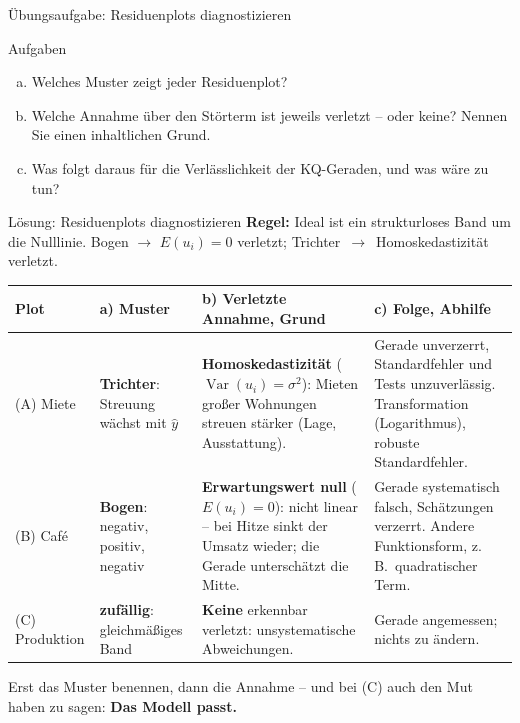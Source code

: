 \documentclass[aspectratio=169,11pt]{beamer}
\begin{document}
\begin{frame}{Übungsaufgabe: Residuenplots diagnostizieren}
\begin{center}
\begin{tikzpicture}
    \end{tikzpicture}
  \end{center}
  \vspace{-8.5pt}
  \begin{exampleblock}{Aufgaben}
    \begin{enumerate}[a)]
      \setlength{\itemsep}{0pt}
      \item Welches Muster zeigt jeder Residuenplot?
      \item Welche Annahme über den Störterm ist jeweils verletzt -- oder keine? Nennen Sie
            einen inhaltlichen Grund.
      \item Was folgt daraus für die Verlässlichkeit der KQ-Geraden, und was wäre zu tun?
    \end{enumerate}
  \end{exampleblock}
\end{frame}

\begin{frame}{Lösung: Residuenplots diagnostizieren}
  \small \textbf{Regel:} Ideal ist ein strukturloses Band um die Nulllinie.
  Bogen $\to$ $E(u_i) = 0$ verletzt; Trichter~$\to$~Homoskedastizität verletzt.\par
  \footnotesize
  \begin{center}
    \renewcommand{\arraystretch}{1.1}
    \begin{tabular}{@{}L{1.9cm} L{2.3cm} L{5.0cm} L{4.6cm}@{}}
      \toprule
      \textbf{Plot} & \textbf{a) Muster} & \textbf{b) Verletzte Annahme, Grund} & \textbf{c) Folge, Abhilfe} \\
      \midrule
      (A) Miete & \textbf{Trichter}: Streuung wächst mit $\hat{y}$
        & \textbf{Homoskedastizität} ($\operatorname{Var}(u_i) = \sigma^{2}$): Mieten
          großer Wohnungen streuen stärker (Lage, Ausstattung).
        & Gerade unverzerrt, Standardfehler und Tests unzuverlässig.
          Transformation (Logarithmus), robuste Standardfehler. \\
      (B) Café & \textbf{Bogen}: negativ, positiv, negativ
        & \textbf{Erwartungswert null} ($E(u_i) = 0$): nicht linear -- bei Hitze sinkt
          der Umsatz wieder; die Gerade unterschätzt die Mitte.
        & Gerade systematisch falsch, Schätzungen verzerrt.
          Andere Funktionsform, z.\,B.\ quadratischer Term. \\
      (C) Produktion & \textbf{zufällig}: gleichmäßiges Band
        & \textbf{Keine} erkennbar verletzt: unsystematische Abweichungen.
        & Gerade angemessen; nichts zu ändern. \\
      \bottomrule
    \end{tabular}
  \end{center}
  \vspace{-2pt}
  \small Erst das Muster benennen, dann die Annahme -- und bei (C) auch den Mut haben zu
  sagen: \textbf{Das Modell passt.}
\end{frame}
\end{document}
